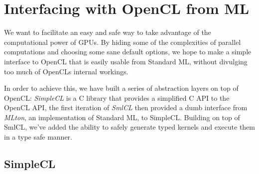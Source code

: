 \section{Interfacing with OpenCL from ML}

We want to facilitate an easy and safe way to take advantage of the
computational power of GPUs. By hiding some of the complexities of
parallel computations and choosing some sane default options, we hope
to make a simple interface to OpenCL that is easily usable from
Standard ML, without divulging too much of OpenCLs internal workings.

In order to achieve this, we have built a series of abstraction layers
on top of OpenCL: \emph{SimpleCL} is a C library that provides a
simplified C API to the OpenCL API, the first iteration of \emph{SmlCL} then
provided a dumb interface from \emph{MLton}, an implementation of Standard
ML, to SimpleCL. Building on top of SmlCL, we've added the ability to
safely generate typed kernels and execute them in a type safe manner.

\subsection{SimpleCL}
